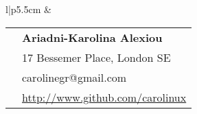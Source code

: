 \documentclass[10pt]{article} %
\begin{document}
\begin{minipage}[t]{0.44\textwidth} %
\vspace{0pt} %


\colorbox{shade}{\textcolor{text1}{
        \begin{tabular}{l|p{5.5cm}}
            \raisebox{-1.25cm}{} &
        \begin{tabular}{l|p{5cm}}
    \raisebox{0pt}{\Smiley} & \textbf{Ariadni-Karolina Alexiou} \\ %
            \raisebox{-1pt}{\textifsymbol{18}}& 17 Bessemer Place, London SE \\ %
    \raisebox{-1pt}{\Letter} & carolinegr@gmail.com \\ %
    \Keyboard & \href{http://www.github.com/carolinux}{http://www.github.com/carolinux} \\ %
        \end{tabular}  \\ %
\end{tabular}
}
}\\[10pt]









\end{minipage}
\end{document}

